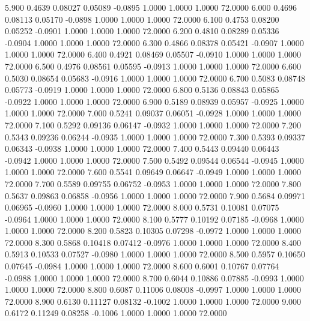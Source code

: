    5.900   0.4639   0.08027   0.05089  -0.0895   1.0000   1.0000   1.0000  72.0000
   6.000   0.4696   0.08113   0.05170  -0.0898   1.0000   1.0000   1.0000  72.0000
   6.100   0.4753   0.08200   0.05252  -0.0901   1.0000   1.0000   1.0000  72.0000
   6.200   0.4810   0.08289   0.05336  -0.0904   1.0000   1.0000   1.0000  72.0000
   6.300   0.4866   0.08378   0.05421  -0.0907   1.0000   1.0000   1.0000  72.0000
   6.400   0.4921   0.08469   0.05507  -0.0910   1.0000   1.0000   1.0000  72.0000
   6.500   0.4976   0.08561   0.05595  -0.0913   1.0000   1.0000   1.0000  72.0000
   6.600   0.5030   0.08654   0.05683  -0.0916   1.0000   1.0000   1.0000  72.0000
   6.700   0.5083   0.08748   0.05773  -0.0919   1.0000   1.0000   1.0000  72.0000
   6.800   0.5136   0.08843   0.05865  -0.0922   1.0000   1.0000   1.0000  72.0000
   6.900   0.5189   0.08939   0.05957  -0.0925   1.0000   1.0000   1.0000  72.0000
   7.000   0.5241   0.09037   0.06051  -0.0928   1.0000   1.0000   1.0000  72.0000
   7.100   0.5292   0.09136   0.06147  -0.0932   1.0000   1.0000   1.0000  72.0000
   7.200   0.5343   0.09236   0.06244  -0.0935   1.0000   1.0000   1.0000  72.0000
   7.300   0.5393   0.09337   0.06343  -0.0938   1.0000   1.0000   1.0000  72.0000
   7.400   0.5443   0.09440   0.06443  -0.0942   1.0000   1.0000   1.0000  72.0000
   7.500   0.5492   0.09544   0.06544  -0.0945   1.0000   1.0000   1.0000  72.0000
   7.600   0.5541   0.09649   0.06647  -0.0949   1.0000   1.0000   1.0000  72.0000
   7.700   0.5589   0.09755   0.06752  -0.0953   1.0000   1.0000   1.0000  72.0000
   7.800   0.5637   0.09863   0.06858  -0.0956   1.0000   1.0000   1.0000  72.0000
   7.900   0.5684   0.09971   0.06965  -0.0960   1.0000   1.0000   1.0000  72.0000
   8.000   0.5731   0.10081   0.07075  -0.0964   1.0000   1.0000   1.0000  72.0000
   8.100   0.5777   0.10192   0.07185  -0.0968   1.0000   1.0000   1.0000  72.0000
   8.200   0.5823   0.10305   0.07298  -0.0972   1.0000   1.0000   1.0000  72.0000
   8.300   0.5868   0.10418   0.07412  -0.0976   1.0000   1.0000   1.0000  72.0000
   8.400   0.5913   0.10533   0.07527  -0.0980   1.0000   1.0000   1.0000  72.0000
   8.500   0.5957   0.10650   0.07645  -0.0984   1.0000   1.0000   1.0000  72.0000
   8.600   0.6001   0.10767   0.07764  -0.0988   1.0000   1.0000   1.0000  72.0000
   8.700   0.6044   0.10886   0.07885  -0.0993   1.0000   1.0000   1.0000  72.0000
   8.800   0.6087   0.11006   0.08008  -0.0997   1.0000   1.0000   1.0000  72.0000
   8.900   0.6130   0.11127   0.08132  -0.1002   1.0000   1.0000   1.0000  72.0000
   9.000   0.6172   0.11249   0.08258  -0.1006   1.0000   1.0000   1.0000  72.0000
